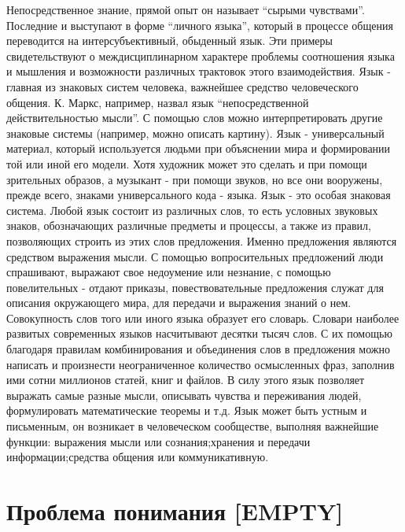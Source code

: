 \documentclass[12pt]{article}
\begin{document}
Непосредственное знание, прямой опыт он называет “сырыми чувствами”. Последние и выступают в форме
“личного  языка”,  который  в  процессе  общения  переводится  на  интерсубъективный,  обыденный  язык.  Эти
примеры  свидетельствуют  о  междисциплинарном  характере  проблемы  соотношения  языка  и  мышления  и
возможности различных трактовок этого взаимодействия.
Язык - главная из знаковых систем человека, важнейшее средство человеческого общения. К. Маркс, например,
назвал язык “непосредственной действительностью мысли”. С помощью слов можно интерпретировать другие
знаковые системы (например, можно описать картину). Язык - универсальный материал, который используется
людьми при объяснении мира и формировании той или иной его модели. Хотя художник может это сделать и
при помощи зрительных образов, а музыкант - при помощи звуков, но все они вооружены, прежде всего,
знаками универсального кода - языка. 
Язык - это особая знаковая система. Любой язык состоит из различных слов, то есть условных звуковых знаков,
обозначающих  различные  предметы  и  процессы,  а  также  из  правил,  позволяющих  строить  из  этих  слов
предложения.  Именно  предложения  являются  средством  выражения  мысли.  С  помощью  вопросительных
предложений люди спрашивают, выражают свое недоумение или незнание, с помощью повелительных - отдают
приказы, повествовательные предложения служат для описания окружающего мира, для передачи и выражения
знаний о нем. Совокупность слов того или иного языка образует его словарь. Словари наиболее развитых
современных языков насчитывают десятки тысяч слов. С их помощью благодаря правилам комбинирования и
объединения слов в предложения можно написать и произнести  неограниченное количество осмысленных
фраз, заполнив ими сотни миллионов статей, книг и файлов. В силу этого язык позволяет выражать самые
разные мысли, описывать чувства и переживания людей, формулировать математические теоремы и т.д.
Язык может быть устным и письменным, он возникает в человеческом сообществе, выполняя  важнейшие
функции:  выражения  мысли  или  сознания;хранения  и  передачи  информации;средства  общения  или
коммуникативную.

\newpage
\section{Проблема понимания [EMPTY]}
\end{document}
